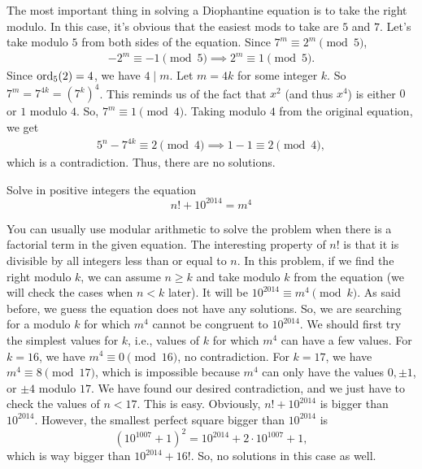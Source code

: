 \documentclass{subfile}
\begin{document}
				\begin{solution}
					The most important thing in solving a Diophantine equation is to take the right modulo. In this case, it's obvious that the easiest mods to take are $5$ and $7$. Let's take modulo $5$ from both sides of the equation. Since $7^m \equiv 2^m \pmod 5$,
						\begin{align*}
							-2^m \equiv -1 \pmod 5 \implies 2^m \equiv 1 \pmod 5.
						\end{align*}
					Since $\operatorname{ord}_5(2)=4$, we have $4 \mid m$. Let $m=4k$ for some integer $k$. So $7^m = 7^{4k}=\left(7^k\right)^4$. This reminds us of the fact that $x^2$ (and thus $x^4$) is either $0$ or $1$ modulo $4$. So, $7^m \equiv 1 \pmod 4$. Taking modulo $4$ from the original equation, we get
						\begin{align*}
							5^n - 7^{4k} \equiv 2 \pmod 4 \implies 1-1 \equiv 2 \pmod 4,
						\end{align*}
					which is a contradiction. Thus, there are no solutions.
				\end{solution}
				
				\begin{problem}[Kazakhstan 2016]
					Solve in positive integers the equation
					\[n!+10^{2014}=m^4\]
				\end{problem}	
				
				\begin{solution}
					You can usually use modular arithmetic to solve the problem when there is a factorial term in the given equation. The interesting property of $n!$ is that it is divisible by all integers less than or equal to $n$. In this problem, if we find the right modulo $k$, we can assume $n\geq k$ and take modulo $k$ from the equation (we will check the cases when $n < k$ later). It will be $10^{2014} \equiv m^4 \pmod k$. As said before, we guess the equation does not have any solutions. So, we are searching for a modulo $k$ for which $m^4$ cannot be congruent to $10^{2014}$. We should first try the simplest values for $k$, i.e., values of $k$ for which $m^4$ can have a few values. For $k=16$, we have $m^4 \equiv 0 \pmod{16}$, no contradiction. For $k=17$, we have $m^4 \equiv 8 \pmod{17}$, which is impossible because $m^4$ can only have the values $0, \pm 1$, or $\pm 4$ modulo $17$. We have found our desired contradiction, and we just have to check the values of $n < 17$. This is easy. Obviously, $n! + 10^{2014}$ is bigger than $10^{2014}$. However, the smallest perfect square bigger than $10^{2014}$ is \[\left(10^{1007}+1\right)^2 = 10^{2014} + 2 \cdot 10^{1007} + 1,\]
					which is way bigger than $10^{2014} + 16!$. So, no solutions in this case as well.
				\end{solution}
				
\end{document}
